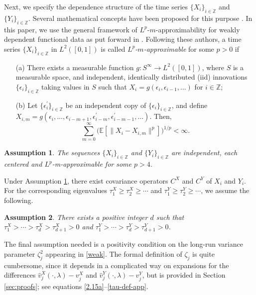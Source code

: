 \documentclass[11pt]{article}
\newtheorem{assumption}{Assumption}[section]
\numberwithin{equation}{section}
\numberwithin{theorem}{section}
\numberwithin{lemma}{section}
\numberwithin{proposition}{section}
\numberwithin{cor}{section}
\numberwithin{definition}{section}
\numberwithin{cons}{section}
\numberwithin{rem}{section}
\numberwithin{exa}{section}
\numberwithin{table}{section}
\numberwithin{figure}{section}
\numberwithin{algo}{section}
\begin{document}
{{Next, we specify the dependence structure of the time series  $\{X_i\}_{i\in \mathbb{Z}}$ and $\{Y_i\}_{i\in \mathbb{Z}}$.
Several mathematical concepts have been proposed for this purpose \citep[see][among many others]{
bradley2005,bertail2006}.
In this paper, we use the general framework  of $L^{p}$-$m$-approximability for weakly dependent functional data as put forward in \cite{hoermann2010}. Following these authors,
a time series $\{X_i\}_{i \in \mathbb{Z}}$ in $L^2([0,1])$  is called {\it  $L^{p}$-$m$-approximable}  for some $p>0$ if
\begin{itemize}
\item[(a)]
There exists a measurable function $g\colon S^\infty\to L^2([0,1])$, where $S$ is a measurable space, and independent, identically distributed (iid) innovations $\{\epsilon_i\}_{i \in \mathbb{Z}}$ taking values in $S$ such that $X_i=g(\epsilon_i,\epsilon_{i-1},\ldots)$ for $i\in\mathbb{Z}$;
\item[(b)] Let $\{\epsilon_i^\prime\}_{i \in \mathbb{Z}}$ be an independent copy of $\{\epsilon_i\}_{i \in \mathbb{Z}}$, and define \\ $X_{i,m}=g(\epsilon_i,\ldots,\epsilon_{i-m+1},\epsilon^\prime_{i-m},\epsilon^\prime_{i-m-1},\ldots)$. Then,
\[
\sum_{m=0}^\infty\big(\mathbb{E}[\|X_i-X_{i,m}\|^p]\big)^{1/p}<\infty .
\]
\end{itemize}

\begin{assumption}\label{edep} The sequences $\{X_i\}_{i \in \mathbb{Z}}$ and  $\{Y_i\}_{i \in \mathbb{Z}}$ are independent,  each centered  and
$L^p$-m-approximable for some $p>4$.
\end{assumption}

Under Assumption \ref{edep},  there exist  covariance operators $C^X$ and $C^{Y}$ of $X_i$ and $Y_i$. For the corresponding eigenvalues $\tau^X_1 \geq \tau^X_2 \geq \cdots$ and $\tau^Y_1 \geq \tau^Y_2 \geq \cdots$, we assume the following.

\begin{assumption} \label{as-spacing} There exists a positive integer $d$ such that $\tau_1^X > \cdots > \tau_d^X  > \tau_{d+1}^X >0$  and $\tau_1^Y > \cdots > \tau_d^Y  > \tau_{d+1}^Y >0$.
\end{assumption}


The final assumption needed is a positivity condition on the long-run variance parameter $\zeta_j^{2}$ appearing in \eqref{weak}. The formal definition of $\zeta_j$ is quite cumbersome, since it depends in a complicated way on expansions for the differences $\hat{v}^X_j(\cdot,\lambda)-v^X_j$ and $\hat{v}^Y_j(\cdot,\lambda)-v^Y_j$, but is provided in Section \ref{sec:proofs}; see equations \eqref{2.15a}--\eqref{tau-def-app}.


}}
\end{document}

